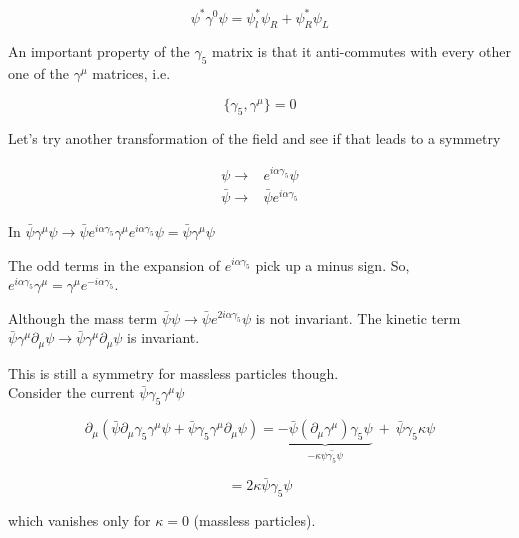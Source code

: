 \documentclass[11pt]{article}
\begin{document}
	  \[ \psi^* \gamma^0 \psi = \psi_l^* \psi_R + \psi^*_R\psi_L\]
	  
	  
	  An important property of the $\gamma_5$ matrix is that it anti-commutes with every other one of the $\gamma^\mu$ matrices, i.e. 
	  
	  \[ \{\gamma_5, \gamma^\mu\} = 0\]
	  
	  Let's try another transformation of the field and see if that leads to a symmetry
	  
	  \begin{align*}
	  	\psi \to & e^{i\alpha \gamma_5} \psi\\
	  	\bar{\psi} \to & \bar{\psi} e^{i\alpha\gamma_5}
	  \end{align*}
  
  		In $\bar{\psi} \gamma^\mu \psi \to \bar{\psi} e^{i\alpha\gamma_5}\gamma^\mu e^{i\alpha\gamma_5} \psi = \bar{\psi} \gamma^\mu\psi $
  		
  		The odd terms in the expansion of $e^{i\alpha \gamma_5}$ pick up a minus sign. So, $e^{i\alpha \gamma_5}\gamma^\mu = \gamma^\mu e^{-i\alpha\gamma_5}$.
	  
	  Although the mass term $\bar{\psi}\psi \to \bar{\psi} e^{2i\alpha \gamma_5} \psi$ is not invariant.
	  The kinetic term $\bar{\psi}\gamma^\mu \partial_\mu\psi \to \bar{\psi} \gamma^\mu \partial_\mu \psi$ is invariant.
	  
	  This is still a symmetry for massless particles though.\\
	  
	  
	  Consider the current $\bar{\psi}\gamma_5 \gamma^\mu \psi$
	  
	  \[ \partial_\mu (\bar{\psi} \partial_\mu \gamma_5 \gamma^\mu \psi + \bar{\psi} \gamma_5 \gamma^\mu\partial_\mu \psi)  = \underbrace{ - \bar{\psi}(\partial_\mu \gamma^\mu) \gamma_5 \psi}_{-\kappa\bar{\psi \gamma_5 \psi}}\ +\ \bar{\psi}\gamma_5 \kappa \psi \]
			
			\[ = 2 \kappa\bar{\psi}\gamma_5\psi\]

	which vanishes only for $\kappa=0$ (massless particles).
\end{document}
